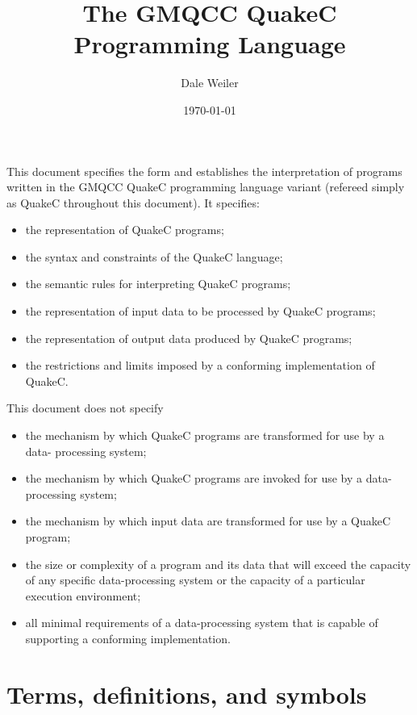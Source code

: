 \documentclass{article}
\title{The GMQCC QuakeC Programming Language}
\author{Dale Weiler}
\date{\today}
\begin{document}
\maketitle
\thispagestyle{empty}
\raggedright
\abstract
This document specifies the form and establishes the interpretation of programs written in
the GMQCC QuakeC programming language variant (refereed simply as QuakeC throughout this
document). It specifies:
\begin{itemize}
	\item the representation of QuakeC programs;
	\item the syntax and constraints of the QuakeC language;
	\item the semantic rules for interpreting QuakeC programs;
	\item the representation of input data to be processed by QuakeC programs;
	\item the representation of output data produced by QuakeC programs;
	\item the restrictions and limits imposed by a conforming implementation of QuakeC.
\end{itemize}
This document does not specify
\begin{itemize}
	\item the mechanism by which QuakeC programs are transformed for use by a data-
	      processing system;
	\item the mechanism by which QuakeC programs are invoked for use by a data-processing
	      system;
	\item the mechanism by which input data are transformed for use by a QuakeC program;
	\item the size or complexity of a program and its data that will exceed the capacity
	      of any specific data-processing system or the capacity of a particular
	      execution environment;
	\item all minimal requirements of a data-processing system that is capable of
	      supporting a conforming implementation.
\end{itemize}

\newpage
\thispagestyle{empty}
\tableofcontents
\newpage

\raggedright %

\section{Terms, definitions, and symbols}
\end{document}

